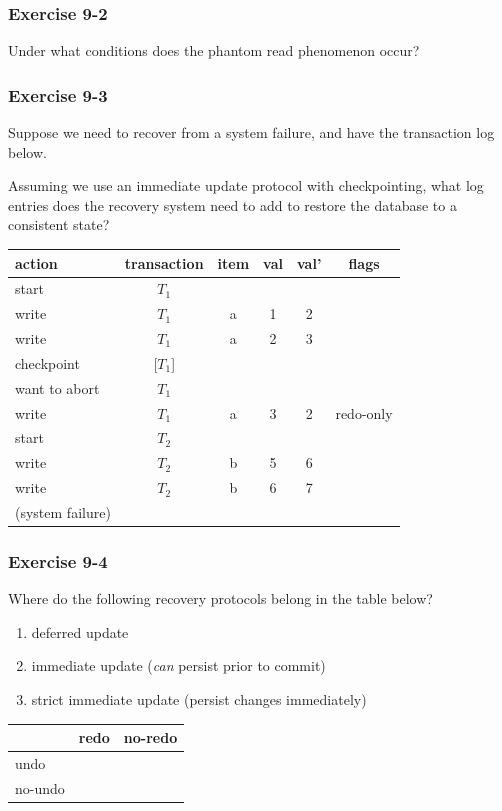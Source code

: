 \begin{frame}
\frametitle{Exercise 9-2}

Under what conditions does the phantom read phenomenon occur?

\end{frame}


\begin{frame}
\frametitle{Exercise 9-3}

Suppose we need to recover from a system failure, and have the transaction log below.

Assuming we use an immediate update protocol with checkpointing, what log entries does the recovery system need to add to restore the database to a consistent state?

\begin{center}
\begin{tabular}{ | l | c c c c | c | }
  \hline
  action & transaction & item & val & val' & flags \\
  \hline
  start & $T_1$ &   &   &   &           \\
  write & $T_1$ & a & 1 & 2 &           \\
  write & $T_1$ & a & 2 & 3 &           \\
  checkpoint & [$T_1$] &   &   &   &           \\
  want to abort & $T_1$ &   &   &   &           \\
  write & $T_1$ & a & 3 & 2 & redo-only \\
  start & $T_2$ &   &   &   &           \\
  write & $T_2$ & b & 5 & 6 &           \\
  write & $T_2$ & b & 6 & 7 &           \\
  (system failure) &       &   &   &   &           \\
  \hline
\end{tabular}
\end{center}

\end{frame}


\begin{frame}
\frametitle{Exercise 9-4}

Where do the following recovery protocols belong in the table below?

\begin{enumerate}
  \item deferred update
  \item immediate update (\textit{can} persist prior to commit)
  \item strict immediate update (persist changes immediately)
\end{enumerate}

\begin{center}
\begin{tabular}{ | l | c | c | }
  \hline
          & redo & no-redo \\
  \hline
  undo    &      &         \\
  \hline
  no-undo &      &         \\
  \hline
\end{tabular}
\end{center}

\end{frame}


